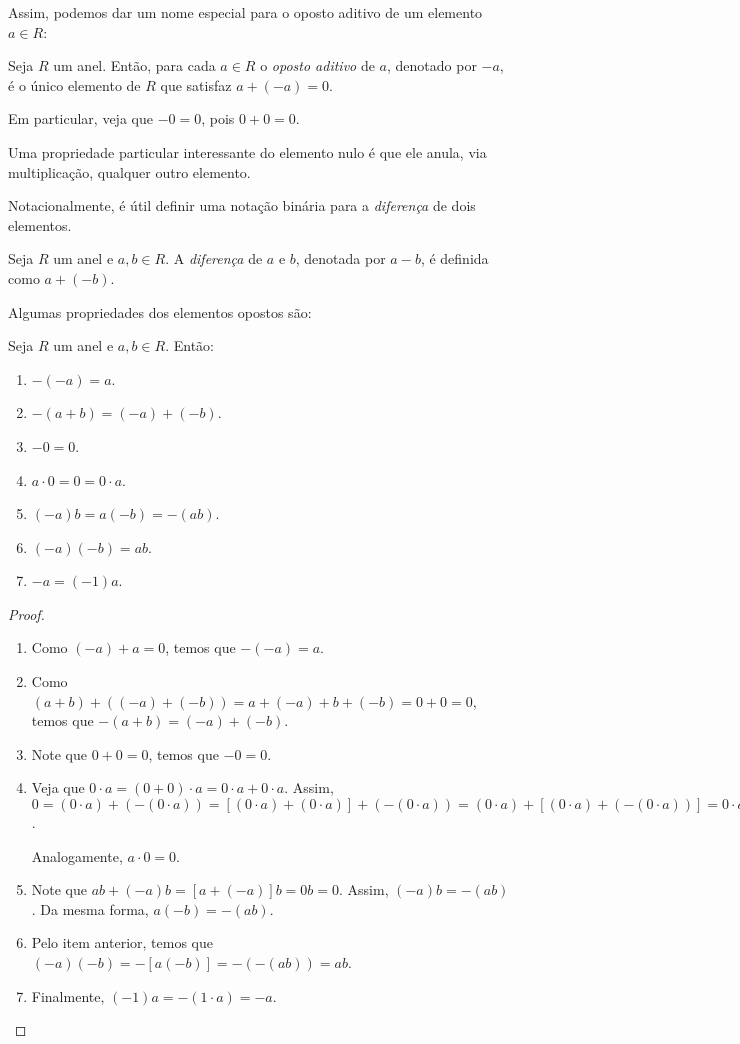 Assim, podemos dar um nome especial para o oposto aditivo de um elemento $a \in R$:

\begin{definition}
    Seja $R$ um anel.
    Então, para cada $a \in R$ o \emph{oposto aditivo} de $a$, denotado por $-a$, é o único elemento de $R$ que satisfaz $a+(-a)=0$.

    Em particular, veja que $-0=0$, pois $0+0=0$.
\end{definition}


Uma propriedade particular interessante do elemento nulo é que ele anula, via multiplicação, qualquer outro elemento.

Notacionalmente, é útil definir uma notação binária para a \emph{diferença} de dois elementos.

\begin{definition}[Diferença]
    Seja $R$ um anel e $a, b \in R$.
    A \emph{diferença} de $a$ e $b$, denotada por $a-b$, é definida como $a+(-b)$.
\end{definition}
Algumas propriedades dos elementos opostos são:
\begin{proposition}
    Seja $R$ um anel e $a, b \in R$.
    Então:
    \begin{enumerate}[label=(\roman*)]
        \item $-(-a)=a$.
        \item $-(a+b)=(-a)+(-b)$.
        \item $-0=0$.
        \item $a\cdot 0=0=0\cdot a$.
        \item $(-a)b=a(-b)=-(ab)$.
        \item $(-a)(-b)=ab$.
        \item $-a=(-1)a$.
    \end{enumerate}
\end{proposition}
\begin{proof}
        \begin{enumerate}[label=(\roman*)]
        \item Como $(-a)+a=0$, temos que $-(-a)=a$.
        \item Como $(a+b)+((-a)+(-b))=a+(-a)+b+(-b)=0+0=0$, temos que $-(a+b)=(-a)+(-b)$.
        \item Note que $0+0=0$, temos que $-0=0$.
        \item Veja que $0\cdot a=(0+0)\cdot a=0\cdot a+0\cdot a$.
        Assim, $0=(0\cdot a)+(-(0\cdot a))=[(0\cdot a)+(0\cdot a)]+(-(0\cdot a))=(0\cdot a)+[(0\cdot a)+(-(0\cdot a))]=0\cdot a$.

        Analogamente, $a\cdot 0=0$.
        \item Note que $ab+(-a)b=[a+(-a)]b=0b=0$.
        Assim, $(-a)b=-(ab)$.
        Da mesma forma, $a(-b)=-(ab)$.
        \item Pelo item anterior, temos que $(-a)(-b)=-[a(-b)]=-(-(ab))=ab$.
        \item Finalmente, $(-1)a=-(1\cdot a)=-a$.
    \end{enumerate}
\end{proof}

